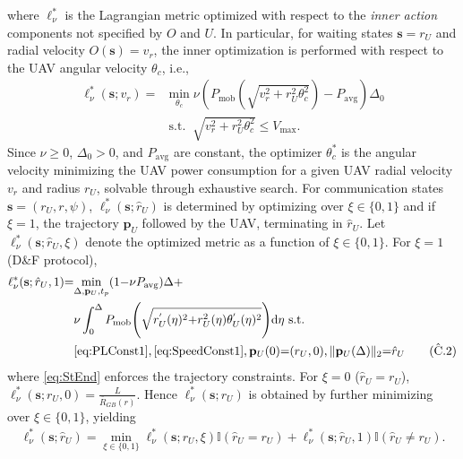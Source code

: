 \documentclass[10pt,twocolumn]{IEEEtran}
\begin{document}
where $\ell_{\nu}^{*}$ is the Lagrangian metric optimized with respect to the \emph{inner action} components not specified by $O$ and $U$. In particular, for waiting states $\mathbf{s}{=}r_{U}$ and radial velocity $O(\mathbf{s}){=}v_{r}$, the inner optimization is performed with respect to the UAV angular velocity $\theta_{c}$, i.e.,
\begin{align}\label{eq:MinLWP}
	\ell_{\nu}^{*}(\mathbf{s}; v_r) = &\underset{\theta_c}{\mathrm{min}}\; \nu \left( P_{\mathrm{mob}}\left(\sqrt{v_{r}^2 + r_U^2\theta_c^2}\right) - P_{\mathrm{avg}} \right)\Delta_0\nonumber\\&\mathrm{s.t.}\;\; \sqrt{v_{r}^{2} + r_U^2\theta_c^2} \leq V_{\mathrm{max}}.
\end{align}
Since $\nu{\geq}0$, $\Delta_{0}{>}0$, and $P_{\mathrm{avg}}$ are constant, the optimizer $\theta_{c}^{*}$ is the angular velocity minimizing the UAV power consumption for a given UAV radial velocity $v_{r}$ and radius $r_{U}$, solvable through exhaustive search. For communication states $\mathbf{s}{=}(r_{U},r,\psi)$, $\ell_{\nu}^{*}(\mathbf{s};\hat{r}_{U})$ is determined by optimizing over $\xi{\in}\{0,1\}$ and if $\xi{=}1$, the trajectory $\mathbf{p}_{U}$ followed by the UAV, terminating in $\hat{r}_{U}$. Let $\ell_{\nu}^{*}(\mathbf{s};\hat{r}_{U},\xi)$ denote the optimized metric as a function of $\xi{\in}\{0,1\}$. For $\xi{=}1$ (D\&F protocol),
\begin{align}\label{eq:EllMin}
    \ell_{\nu}^{*}(\mathbf{s};\hat{r}_{U},1){=}&\underset{\Delta,\mathbf{p}_{U},t_{p}}{\mathrm{min}}(1{-}\nu P_{\mathrm{avg}})\Delta + \\&\nu\int_{0}^{\Delta}P_{\mathrm{mob}}\Bigg(\sqrt{r_{U}^{'}(\eta)^{2}{+}r_{U}^{2}(\eta)\theta_{U}^{'}(\eta)^{2}}\Bigg)\mathrm{d}\eta\text{ s.t. }\nonumber
    \\&\text{\ref{eq:PLConst1}},\text{\ref{eq:SpeedConst1}}\nonumber,\mathbf{p}_{U}(0){=}(r_{U},0),\Vert\mathbf{p}_{U}(\Delta)\Vert_{2}{=}\hat{r}_{U}\tag{$\hat{\text{C}}$.2}\label{eq:StEnd}
\end{align}
where \ref{eq:StEnd} enforces the trajectory constraints. For $\xi{=}0$ ($\hat{r}_{U}{=}r_{U}$), $\ell_{\nu}^{*}(\mathbf{s};r_{U},0){=}\frac{L}{\bar{R}_{GB}(r)}$. Hence $\ell_{\nu}^{*}(\mathbf{s};r_{U})$ is obtained by further minimizing over $\xi{\in}\{0,1\}$, yielding
\begin{align*}\label{ellnushatru}
	\ell_{\nu}^{*}(\mathbf{s};\hat{r}_{U}){=}\underset{\xi{\in}\{0,1\}}{\min}\ell_{\nu}^{*}(\mathbf{s};r_{U},\xi)\mathbb{I}(\hat{r}_{U}{=}r_{U}){+}\ell_{\nu}^{*}(\mathbf{s};\hat{r}_{U},1)\mathbb{I}(\hat{r}_{U}{\neq}{r}_{U}).
\end{align*}
\end{document}
